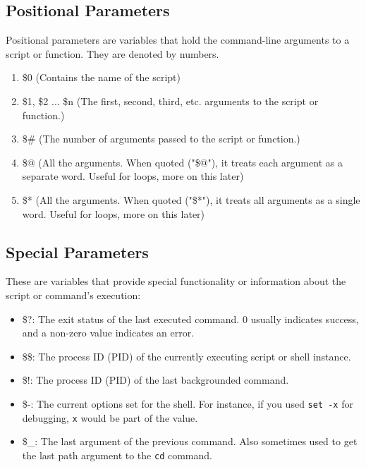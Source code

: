 \documentclass{report}
\begin{document}
    \subsection{Positional Parameters}
    \bigbreak \noindent 
    Positional parameters are variables that hold the command-line arguments to a script or function. They are denoted by numbers.
    \begin{enumerate}
        \item \$0 (Contains the name of the script)
        \item \$1, \$2 ... \$n (The first, second, third, etc. arguments to the script or function.)
        \item \$\# (The number of arguments passed to the script or function.)
        \item \$@ (All the arguments. When quoted ("\$@"), it treats each argument as a separate word. Useful for loops, more on this later)
        \item \$* (All the arguments. When quoted ("\$*"), it treats all arguments as a single word. Useful for loops, more on this later)
    \end{enumerate}

    \pagebreak \bigbreak \noindent 
    \subsection{Special Parameters}
    \bigbreak \noindent 
    These are variables that provide special functionality or information about the script or command's execution:
    \bigbreak \noindent 
    \begin{itemize}
        \item \$?: The exit status of the last executed command. \(0\) usually indicates success, and a non-zero value indicates an error.
        \item \$\$: The process ID (PID) of the currently executing script or shell instance.
        \item \$!: The process ID (PID) of the last backgrounded command.
        \item \$-: The current options set for the shell. For instance, if you used \texttt{set -x} for debugging, \texttt{x} would be part of the value.
        \item \$\_: The last argument of the previous command. Also sometimes used to get the last path argument to the \texttt{cd} command.
    \end{itemize}

    \bigbreak \noindent 
\end{document}
